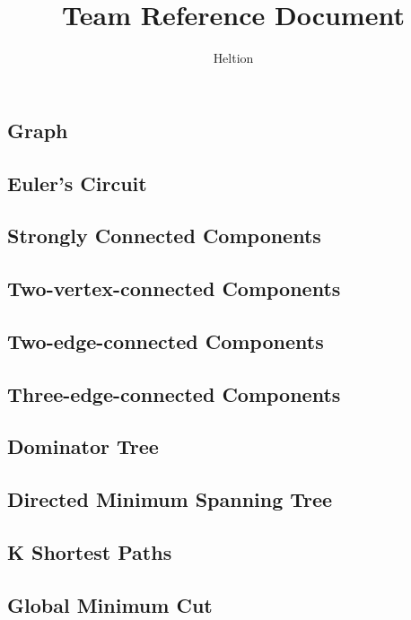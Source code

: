 \documentclass{article}
\begin{document}
\title{Team Reference Document}
\author{Heltion}
\maketitle
\newpage
\begin{multicols}{2}
    \tableofcontents
    \newpage

    \section{Graph}
    \subsection{Euler's Circuit}
    
    \subsection{Strongly Connected Components}
    
    \subsection{Two-vertex-connected Components}
    
    \subsection{Two-edge-connected Components}
    
    \subsection{Three-edge-connected Components}
    
    \subsection{Dominator Tree}
    
    \subsection{Directed Minimum Spanning Tree}
    
    \subsection{K Shortest Paths}
    
    \subsection{Global Minimum Cut}
    

\end{multicols}
\end{document}
